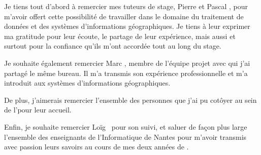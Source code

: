 
Je tiens tout d'abord à remercier mes tuteurs de stage, Pierre  et Pascal , pour m'avoir offert cette possibilité de travailler dans le domaine du traitement de données et des systèmes d'informations géographiques. Je tiens à leur exprimer ma gratitude pour leur écoute, le partage de leur expérience, mais aussi et surtout pour la confiance qu'ils m'ont accordée tout au long du stage.

Je souhaite également remercier Marc , membre de l'équipe projet avec qui j'ai partagé le même bureau. Il m'a transmis son expérience professionnelle et m'a introduit aux systèmes d'informations géographiques.

De plus, j'aimerais remercier l'ensemble des personnes que j'ai pu cotôyer au sein de l'\ifsttar pour leur accueil.

Enfin, je souhaite remercier Loïg~ pour son suivi, et saluer de façon plus large l'ensemble des enseignants de l'\iut Informatique de Nantes pour m'avoir transmis avec passion leurs savoirs au cours de mes deux années de \dut.

\clearpage

